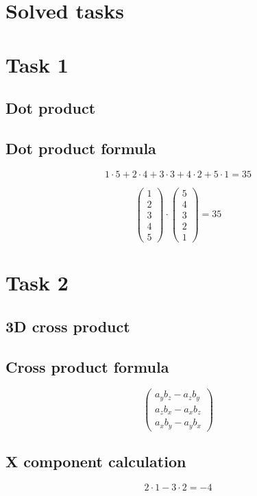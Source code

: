 \documentclass{article}
\begin{document}
\section*{Solved tasks}
\section*{Task 1}

\subsection*{Dot product}
\subsection*{ \vspace{1em} Dot product formula}
\[
1 \cdot 5 + 2 \cdot 4 + 3 \cdot 3 + 4 \cdot 2 + 5 \cdot 1 = 35
\]
\medskip

\[
\begin{pmatrix}1 \\ 2 \\ 3 \\ 4 \\ 5\end{pmatrix} \cdot \begin{pmatrix}5 \\ 4 \\ 3 \\ 2 \\ 1\end{pmatrix} = 35
\]
\bigskip

\hrulefill
\bigskip

\section*{Task 2}

\subsection*{3D cross product}
\subsection*{ \vspace{1em} Cross product formula}
\[
\begin{pmatrix}
a_y b_z - a_z b_y \\ 
a_z b_x - a_x b_z \\ 
a_x b_y - a_y b_x
\end{pmatrix}
\]
\subsection*{ \vspace{1em} X component calculation}
\[
2 \cdot 1 - 3 \cdot 2 = -4
\]
\end{document}
